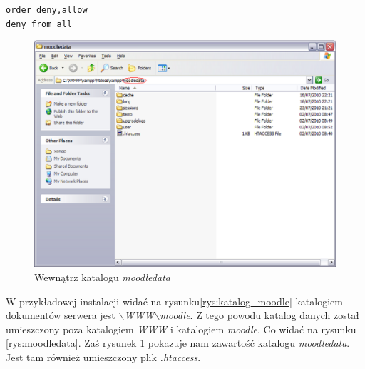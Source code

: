 \hspace{2cm} \texttt{order deny,allow} \\
\hspace{2cm} \texttt{deny from all} \\
\begin{figure}[!hb]
	\centering
		\caption{Wewnątrz katalogu \textit{moodledata}} \label{rys:in_moodledata}
		\includegraphics[width=1\textwidth]{char_narzarzedzi//rys//in_moodledata.eps}
\end{figure}
W przykładowej instalacji widać na rysunku\ref{rys:katalog_moodle} katalogiem dokumentów serwera jest \textit{$\backslash$WWW$\backslash$moodle}. Z tego powodu katalog danych został umieszczony poza katalogiem \textit{WWW} i katalogiem \textit{moodle}. Co widać na rysunku \ref{rys:moodledata}. Zaś rysunek \ref{rys:in_moodledata} pokazuje nam zawartość katalogu \textit{moodledata}. Jest tam również umieszczony plik \textit{.htaccess}. \\
